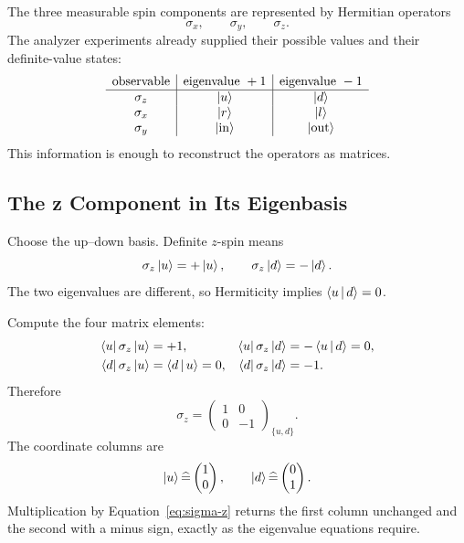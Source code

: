 The three measurable spin components are represented by Hermitian operators
\[
\sigma_x,\qquad \sigma_y,\qquad \sigma_z.
\]
The analyzer experiments already supplied their possible values and their definite-value states:
\[
\begin{array}{c|c|c}
\text{observable}&\text{eigenvalue }+1&\text{eigenvalue }-1\\ \hline
\sigma_z&\left\lvert u\right\rangle&\left\lvert d\right\rangle\\
\sigma_x&\left\lvert r\right\rangle&\left\lvert l\right\rangle\\
\sigma_y&\left\lvert\mathrm{in}\right\rangle&\left\lvert\mathrm{out}\right\rangle
\end{array}
\]
This information is enough to reconstruct the operators as matrices.

\subsection{The z Component in Its Eigenbasis}

Choose the up--down basis. Definite \(z\)-spin means
\begin{equation}
\sigma_z\left\lvert u\right\rangle=+\left\lvert u\right\rangle,
\qquad
\sigma_z\left\lvert d\right\rangle=-\left\lvert d\right\rangle.
\label{eq:sigma-z-eigenvectors}
\end{equation}
The two eigenvalues are different, so Hermiticity implies \(\left\langle u\,\middle|\,d\right\rangle=0\).

Compute the four matrix elements:
\begin{align}
\left\langle u\right\rvert\sigma_z\left\lvert u\right\rangle&=+1,&
\left\langle u\right\rvert\sigma_z\left\lvert d\right\rangle&=-\left\langle u\,\middle|\,d\right\rangle=0,\\
\left\langle d\right\rvert\sigma_z\left\lvert u\right\rangle&=\left\langle d\,\middle|\,u\right\rangle=0,&
\left\langle d\right\rvert\sigma_z\left\lvert d\right\rangle&=-1.
\end{align}
Therefore
\begin{equation}
\boxed{
\sigma_z=
\begin{pmatrix}
1&0\\
0&-1
\end{pmatrix}_{\{u,d\}}.}
\label{eq:sigma-z}
\end{equation}
The coordinate columns are
\[
\left\lvert u\right\rangle\widehat{=}\begin{pmatrix}1\\0\end{pmatrix},
\qquad
\left\lvert d\right\rangle\widehat{=}\begin{pmatrix}0\\1\end{pmatrix}.
\]
Multiplication by Equation~\eqref{eq:sigma-z} returns the first column unchanged and the second with a minus sign, exactly as the eigenvalue equations require.

